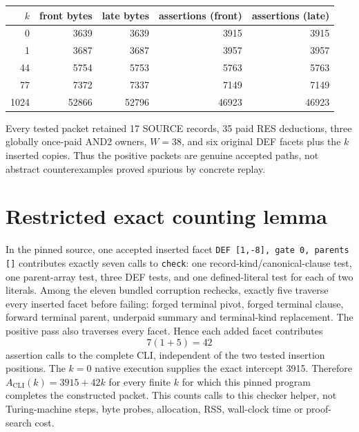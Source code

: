 \documentclass[11pt]{article}
\begin{document}
\begin{center}
\begin{tabular}{rrrrr}
\toprule
$k$ & front bytes & late bytes & assertions (front) & assertions (late)\\
\midrule
0 & 3639 & 3639 & 3915 & 3915\\
1 & 3687 & 3687 & 3957 & 3957\\
44 & 5754 & 5753 & 5763 & 5763\\
77 & 7372 & 7337 & 7149 & 7149\\
1024 & 52866 & 52796 & 46923 & 46923\\
\bottomrule
\end{tabular}
\end{center}

Every tested packet retained 17 SOURCE records, 35 paid RES deductions, three globally once-paid AND2 owners, $W=38$, and six original DEF facets plus the $k$ inserted copies.  Thus the positive packets are genuine accepted paths, not abstract counterexamples proved spurious by concrete replay.

\section*{Restricted exact counting lemma}
In the pinned source, one accepted inserted facet \texttt{DEF [1,-8], gate 0, parents []} contributes exactly seven calls to \texttt{check}: one record-kind/canonical-clause test, one parent-array test, three DEF tests, and one defined-literal test for each of two literals.  Among the eleven bundled corruption rechecks, exactly five traverse every inserted facet before failing: forged terminal pivot, forged terminal clause, forward terminal parent, underpaid summary and terminal-kind replacement.  The positive pass also traverses every facet.  Hence each added facet contributes
\[
 7(1+5)=42
\]
assertion calls to the complete CLI, independent of the two tested insertion positions.  The $k=0$ native execution supplies the exact intercept 3915.  Therefore $A_{\mathrm{CLI}}(k)=3915+42k$ for every finite $k$ for which this pinned program completes the constructed packet.  This counts calls to this checker helper, not Turing-machine steps, byte probes, allocation, RSS, wall-clock time or proof-search cost.
\end{document}
